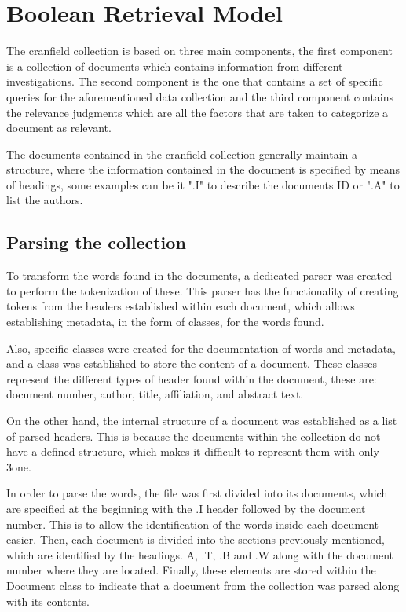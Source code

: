 \documentclass{article}
\begin{document}
\section{Boolean Retrieval Model} %

The cranfield collection is based on three main components, the first component is a collection of documents which contains information from different investigations. The second component is the one that contains a set of specific queries for the aforementioned data collection and the third component contains the relevance judgments which are all the factors that are taken to categorize a document as relevant.

The documents contained in the cranfield collection generally maintain a structure, where the information contained in the document is specified by means of headings, some examples can be it ".I" to describe the documents ID or ".A" to list the authors. 


\subsection{Parsing the collection}

To transform the words found in the documents, a dedicated parser was created to perform the tokenization of these. This parser has the functionality of creating tokens from the headers established within each document, which allows establishing metadata, in the form of classes, for the words found. 

Also, specific classes were created for the documentation of words and metadata, and a class was established to store the content of a document. These classes represent the different types of header found within the document, these are: document number, author, title, affiliation, and abstract text.

On the other hand, the internal structure of a document was established as a list of parsed headers. This is because the documents within the collection do not have a defined structure, which makes it difficult to represent them with only 3one. 

In order to parse the words, the file was first divided into its documents, which are specified at the beginning with the .I header followed by the document number. This is to allow the identification of the words inside each document easier. Then, each document is divided into the sections previously mentioned, which are identified by the headings. A, .T, .B and .W along with the document number where they are located. Finally, these elements are stored within the Document class to indicate that a document from the collection was parsed along with its contents. 
\end{document}
